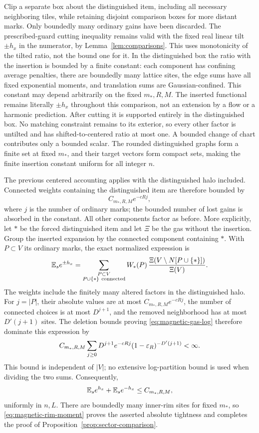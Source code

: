Clip a separate box about the distinguished item, including
all necessary neighboring tiles, while retaining disjoint
comparison boxes for more distant marks. Only boundedly many
ordinary gains have been discarded. The prescribed-guard
cutting inequality remains valid with the fixed real linear
tilt \(\pm h_x\) in the numerator, by
Lemma~\ref{lem:comparisons}. This uses monotonicity of the
tilted ratio, not the bound one for it. In the distinguished
box the ratio with the insertion is bounded by a finite
constant: each component has confining average penalties,
there are boundedly many lattice sites, the edge sums have
all fixed exponential moments, and translation sums are
Gaussian-confined. This constant may depend arbitrarily on
the fixed \(m_*,R,M\).
The inserted functional remains literally \(\pm h_x\)
throughout this comparison, not an extension by a flow or a
harmonic prediction. After cutting it is supported entirely
in the distinguished box. No matching constraint remains
to its exterior, so every other factor is untilted and has
shifted-to-centered ratio at most one. A bounded change of
chart contributes only a bounded scalar. The rounded
distinguished graphs form a finite set at fixed \(m_*\),
and their target vectors form compact sets, making the
finite insertion constant uniform for all integer \(n\).

The previous centered accounting applies with the distinguished
halo included. Connected weights containing the distinguished
item are therefore bounded by
\[
                       C_{m_*,R,M}e^{-cRj},
\]
where \(j\) is the number of ordinary marks; the bounded
number of lost gains is absorbed in the constant. All other
components factor as before. More explicitly, let \(*\) be
the forced distinguished item and let \(\Xi\) be the gas
without the insertion. Group the inserted expansion by the
connected component containing \(*\). With \(P\subset V\)
its ordinary marks, the exact normalized expression is
\[
 \mathbb E_s e^{\pm h_x}
   =\sum_{\substack{P\subset V\\P\cup\{*\}\ \mathrm{connected}}}
       W_*(P)\,
       \frac{\Xi(V\setminus N[P\cup\{*\}])}{\Xi(V)}.
\]
The weights include the finitely many altered factors in
the distinguished halo. For \(j=|P|\), their absolute values
are at most \(C_{m_*,R,M}e^{-cRj}\), the number of connected
choices is at most \(D^{j+1}\), and the removed neighborhood
has at most \(D'(j+1)\) sites. The deletion bounds proving
\eqref{eq:magnetic-gas-log} therefore dominate this expression
by
\[
 C_{m_*,R,M}
   \sum_{j\ge0}D^{j+1}e^{-cRj}
                    (1-\varepsilon_R)^{-D'(j+1)}<\infty.
\]
This bound is independent of \(|V|\); no extensive
log-partition bound is used when dividing the two sums.
Consequently,
\begin{equation}\label{eq:magnetic-rim-moment}
       \mathbb E_s e^{h_x}+\mathbb E_s e^{-h_x}\le C_{m_*,R,M},
\end{equation}
uniformly in \(n,L\). There are boundedly many inner-rim sites
for fixed \(m_*\), so \eqref{eq:magnetic-rim-moment} proves
the asserted absolute tightness and completes the proof of
Proposition~\ref{prop:sector-comparison}.

